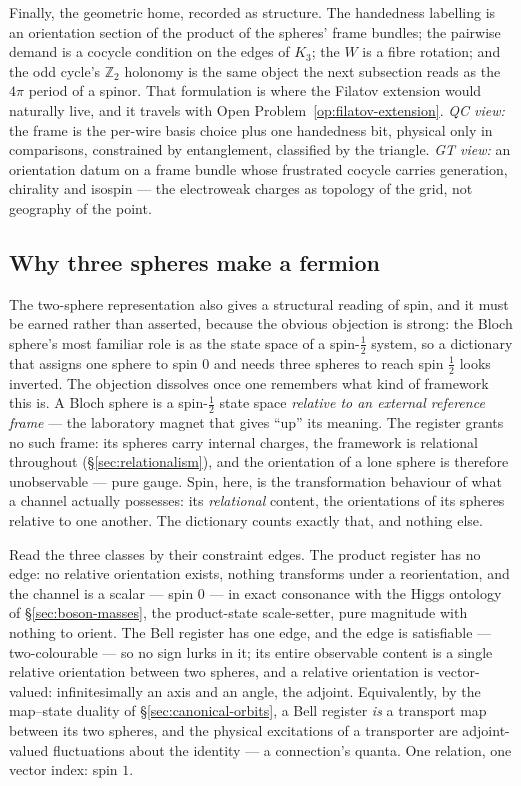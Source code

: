 Finally, the geometric home, recorded as structure. The handedness labelling is an orientation
section of the product of the spheres' frame bundles; the pairwise demand is a cocycle condition on
the edges of $K_3$; the $W$ is a fibre rotation; and the odd cycle's $\mathbb{Z}_2$ holonomy is
the same object the next subsection reads as the $4\pi$ period of a spinor. That formulation is
where the Filatov extension would naturally live, and it travels with
Open Problem~\ref{op:filatov-extension}. \emph{QC view:} the frame is the per-wire basis choice
plus one handedness bit, physical only in comparisons, constrained by entanglement, classified by
the triangle. \emph{GT view:} an orientation datum on a frame bundle whose frustrated cocycle
carries generation, chirality and isospin --- the electroweak charges as topology of the grid, not
geography of the point.

\subsection{Why three spheres make a fermion}

The two-sphere representation also gives a structural reading of spin, and it must be earned
rather than asserted, because the obvious objection is strong: the Bloch sphere's most familiar
role is as the state space of a spin-$\tfrac12$ system, so a dictionary that assigns one sphere to
spin $0$ and needs three spheres to reach spin $\tfrac12$ looks inverted. The objection dissolves
once one remembers what kind of framework this is. A Bloch sphere is a spin-$\tfrac12$ state space
\emph{relative to an external reference frame} --- the laboratory magnet that gives ``up'' its
meaning. The register grants no such frame: its spheres carry internal charges, the framework is
relational throughout (\S\ref{sec:relationalism}), and the orientation of a lone sphere is
therefore unobservable --- pure gauge. Spin, here, is the transformation behaviour of what a
channel actually possesses: its \emph{relational} content, the orientations of its spheres
relative to one another. The dictionary counts exactly that, and nothing else.

Read the three classes by their constraint edges. The product register has no edge: no relative
orientation exists, nothing transforms under a reorientation, and the channel is a scalar ---
spin $0$ --- in exact consonance with the Higgs ontology of \S\ref{sec:boson-masses}, the
product-state scale-setter, pure magnitude with nothing to orient. The Bell register has one edge,
and the edge is satisfiable --- two-colourable --- so no sign lurks in it; its entire observable
content is a single relative orientation between two spheres, and a relative orientation is
vector-valued: infinitesimally an axis and an angle, the adjoint. Equivalently, by the map--state
duality of \S\ref{sec:canonical-orbits}, a Bell register \emph{is} a transport map between its
two spheres, and the physical excitations of a transporter are adjoint-valued fluctuations about
the identity --- a connection's quanta. One relation, one vector index: spin $1$.


